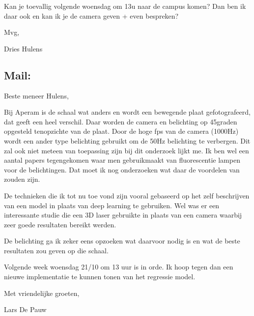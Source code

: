 \documentclass{scrartcl}
\begin{document}
 Kan je toevallig volgende woensdag om 13u naar de campus komen? Dan ben ik daar ook en kan ik je de camera geven + even bespreken?



Mvg,



Dries Hulens



\subsection{Mail:}

Beste meneer Hulens,



Bij Aperam is de schaal wat anders en wordt een bewegende plaat gefotografeerd, dat geeft een heel verschil. Daar worden de camera en belichting op 45graden opgesteld tenopzichte van de plaat. Door de hoge fps van de camera (1000Hz) wordt een ander type belichting gebruikt om de 50Hz belichting te verbergen. Dit zal ook niet meteen van toepassing zijn bij dit onderzoek lijkt me. Ik ben wel een aantal papers tegengekomen waar men gebruikmaakt van fluorescentie lampen voor de belichtingen. Dat moet ik nog onderzoeken wat daar de voordelen van zouden zijn.



De technieken die ik tot nu toe vond zijn vooral gebaseerd op het zelf beschrijven van een model in plaats van deep learning te gebruiken. Wel was er een interessante studie die een 3D laser gebruikte in plaats van een camera waarbij zeer goede resultaten bereikt werden. 

De belichting ga ik zeker eens opzoeken wat daarvoor nodig is en wat de beste resultaten zou geven op die schaal. 



Volgende week woensdag 21/10 om 13 uur is in orde. Ik hoop tegen dan een nieuwe implementatie te kunnen tonen van het regressie model.



Met vriendelijke groeten,



Lars De Pauw
\end{document}

